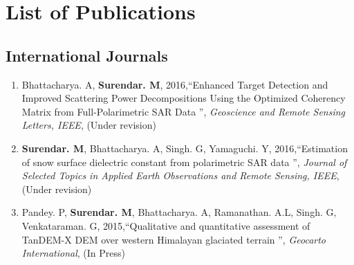 \chapter*{List of Publications}
\label{ch:pub}

   
\section*{International Journals}
\begin{enumerate}
	
	\item Bhattacharya. A, \textbf{Surendar. M}, 2016,\textquotedblleft Enhanced Target Detection and Improved Scattering Power Decompositions Using the Optimized Coherency Matrix from Full-Polarimetric SAR Data \textquotedblright, \textit{Geoscience and Remote Sensing Letters, IEEE}, (Under revision)
	
	\item \textbf{Surendar. M}, Bhattacharya. A, Singh. G,  Yamaguchi. Y, 2016,\textquotedblleft Estimation of snow surface dielectric constant from polarimetric SAR data \textquotedblright, \textit{Journal of Selected Topics in Applied Earth Observations and Remote Sensing, IEEE}, (Under revision)
	
	\item Pandey. P, \textbf{Surendar. M}, Bhattacharya. A, Ramanathan. A.L, Singh. G, Venkataraman. G, 2015,\textquotedblleft Qualitative and quantitative assessment of TanDEM-X DEM over western Himalayan glaciated terrain \textquotedblright, \textit{Geocarto International}, (In Press)
	
\end{enumerate}

